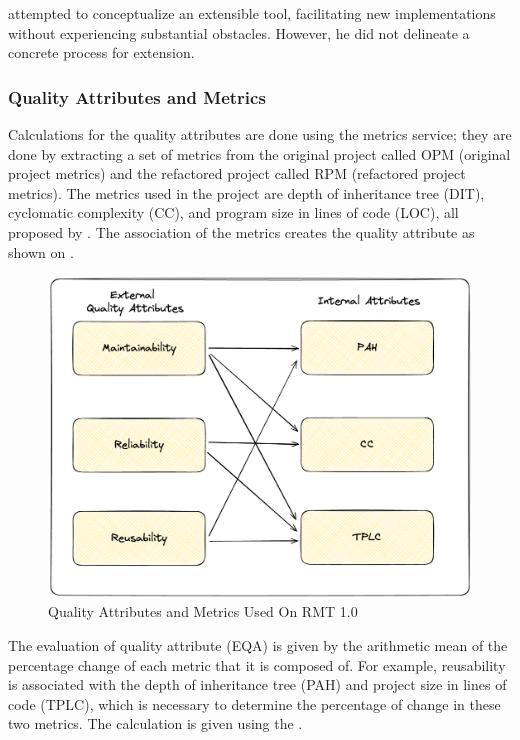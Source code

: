 \textcite{beluzzo2018abordagem} attempted to conceptualize an extensible tool, facilitating new implementations without experiencing substantial obstacles. However, he did not delineate a concrete process for extension.

\subsubsection{Quality Attributes and Metrics}

Calculations for the quality attributes are done using the metrics service; they are done by extracting a set of metrics from the original project called OPM (original project metrics) and the refactored project called RPM (refactored project metrics). The metrics used in the project are depth of inheritance tree (DIT), cyclomatic complexity (CC), and program size in lines of code (LOC), all proposed by \textcite{sommerville2004software}. The association of the metrics creates the quality attribute as shown on .

\begin{figure}[ht!]
\SetCaptionWidth{\textwidth}
\caption{Quality Attributes and Metrics Used On RMT 1.0}
\label{fig-quality-attributes}
\includegraphics[width=\textwidth]{Chapter-2/Figures/QualittyAttributes.png}
\end{figure}
\FloatBarrier

The evaluation of quality attribute (EQA) is given by the arithmetic mean of the percentage change of each metric that it is composed of. For example, reusability is associated with the depth of inheritance tree (PAH) and project size in lines of code (TPLC), which is necessary to determine the percentage of change in these two metrics. The calculation is given using the .

